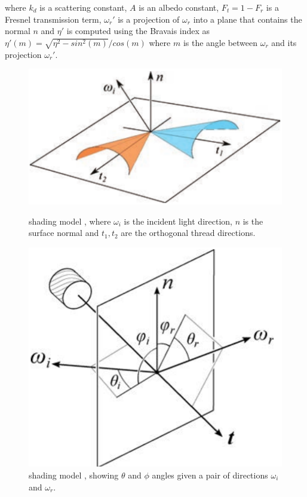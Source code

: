 \documentclass[12pt]{article}
\begin{document}
where $k_d$ is a scattering constant, $A$ is an albedo constant, $F_t = 1 - F_r$ is a Fresnel transmission term, $\omega_r'$ is a projection of $\omega_r$ into a plane that contains the normal $n$ and $\eta'$ is computed using the Bravais index \cite{Marschner2003} as $\eta'(m) = \sqrt{\eta^2 - sin^2(m)}  / cos(m)$ where $m$ is the angle between $\omega_r$ and its projection $\omega_r'$.

\begin{figure}[ht!]
\begin{minipage}[b]{.45\textwidth}
\centering
\includegraphics[width=1\textwidth]{images/microcylinders}
	\caption{\citeauthor{Sadeghi2013} shading model \cite{Sadeghi2013}, where $\omega_i$ is the incident light direction, $n$ is the surface normal and $t_1,t_2$ are the orthogonal thread directions.}
	\label{fig:microcylinders}
\end{minipage}
\hfill
\begin{minipage}[b]{.45\textwidth}
\centering
\includegraphics[width=1\textwidth]{images/cloth_directions}
	\caption{\citeauthor{Sadeghi2013} shading model \cite{Sadeghi2013}, showing $\theta$ and $\phi$ angles given a pair of directions $\omega_i$ and $\omega_r$.}
	\label{fig:cloth_directions}
\end{minipage}
\end{figure}
\end{document}
